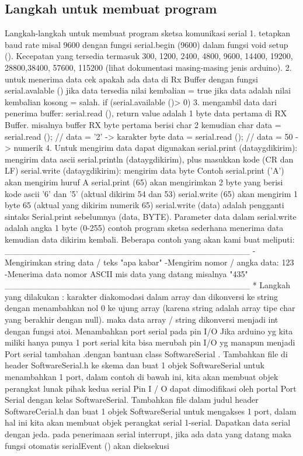 \subsection {Langkah untuk membuat program}
Langkah-langkah untuk membuat program sketsa komunikasi serial
1. tetapkan baud rate misal 9600 dengan fungsi serial.begin (9600) dalam fungsi void setup (). Kecepatan yang tersedia termasuk 300, 1200, 2400, 4800, 9600, 14400, 19200, 28800,38400, 57600, 115200 (lihat dokumentasi masing-masing jenis arduino).
2. untuk menerima data cek apakah ada data di Rx Buffer dengan fungsi serial.avalable ()
jika data tersedia nilai kembalian = true jika data adalah nilai kembalian kosong = salah.
if (serial.available ()> 0)
3. mengambil data dari penerima buffer: serial.read (), return value adalah 1 byte data pertama di RX Buffer.
misalnya buffer RX byte pertama berisi char 2
kemudian char data = serial.read (); // data = '2' -> karakter
byte data = serial.read (); // data = 50 -> numerik
4. Untuk mengirim data dapat digunakan
serial.print (dataygdikirim): mengirim data ascii
serial.println (dataygdikirim), plus masukkan kode (CR dan LF)
serial.write (dataygdikirim): mengirim data byte
Contoh serial.print ('A') akan mengirim huruf A
serial.print (65) akan mengirimkan 2 byte yang berisi kode ascii '6' dan '5' (aktual dikirim 54 dan 53)
serial.write (65) akan mengirim 1 byte 65 (aktual yang dikirim numerik 65)
serial.write (data) adalah pengganti sintaks Serial.print sebelumnya (data, BYTE). Parameter data dalam serial.write adalah angka 1 byte (0-255)
contoh program sketsa sederhana menerima data kemudian data dikirim kembali.
Beberapa contoh yang akan kami buat meliputi:
________________________________________
- Mengirimkan string data / teks "apa kabar"
-Mengirim nomor / angka data: 123
-Menerima data nomor ASCII mis data yang datang misalnya "435"
________________________________________
* Langkah yang dilakukan :
karakter diakomodasi dalam array dan dikonversi ke string dengan menambahkan nol 0 ke ujung array (karena string adalah array tipe char yang berakhir dengan null). maka data array / string dikonversi menjadi int dengan fungsi atoi.
Menambahkan port serial pada pin I/O
Jika arduino yg kita miliki hanya punya 1 port serial kita bisa merubah pin I/O yg manapun menjadi Port serial tambahan .dengan bantuan class SoftwareSerial  .  Tambahkan file di header SoftwareSerial.h ke skema dan buat 1 objek SoftwareSerial untuk menambahkan 1 port, dalam contoh di bawah ini, kita akan membuat objek perangkat lunak pihak kedua serial
Pin I / O dapat dimodifikasi oleh portal Port Serial dengan kelas SoftwareSerial. Tambahkan file dalam judul header SoftwareCerial.h dan buat 1 objek SoftwareSerial untuk mengakses 1 port, dalam hal ini kita akan membuat objek perangkat serial 1-serial.
Dapatkan data serial dengan jeda.
pada penerimaan serial interrupt, jika ada data yang datang maka fungsi otomatis serialEvent () akan dieksekusi
